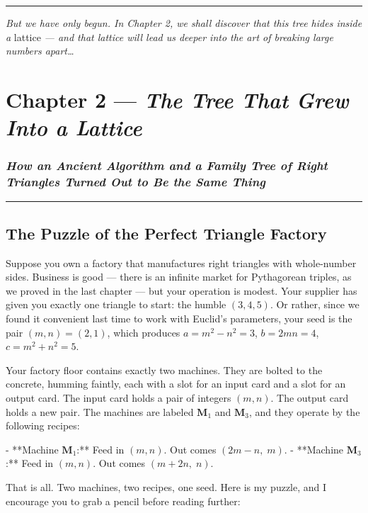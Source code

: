 \documentclass[12pt, letterpaper, openany]{book}
\theoremstyle{definition}
\theoremstyle{remark}
\begin{document}
\bigskip\noindent\rule{\textwidth}{0.4pt}\bigskip


\textit{But we have only begun. In Chapter 2, we shall discover that this tree hides inside a} lattice \textit{--- and that lattice will lead us deeper into the art of breaking large numbers apart{\ldots}}


\clearpage

\chapter{Chapter 2 --- \textit{The Tree That Grew Into a Lattice}}



\subsection*{\textit{How an Ancient Algorithm and a Family Tree of Right Triangles Turned Out to Be the Same Thing}}



\bigskip\noindent\rule{\textwidth}{0.4pt}\bigskip



\section*{The Puzzle of the Perfect Triangle Factory}


Suppose you own a factory that manufactures right triangles with whole-number sides. Business is good --- there is an infinite market for Pythagorean triples, as we proved in the last chapter --- but your operation is modest. Your supplier has given you exactly one triangle to start: the humble $(3, 4, 5)$. Or rather, since we found it convenient last time to work with Euclid's parameters, your seed is the pair $(m, n) = (2, 1)$, which produces $a = m^2 - n^2 = 3$, $b = 2mn = 4$, $c = m^2 + n^2 = 5$.

Your factory floor contains exactly two machines. They are bolted to the concrete, humming faintly, each with a slot for an input card and a slot for an output card. The input card holds a pair of integers $(m, n)$. The output card holds a new pair. The machines are labeled $\mathbf{M}_1$ and $\mathbf{M}_3$, and they operate by the following recipes:

- **Machine $\mathbf{M}_1$:** Feed in $(m, n)$. Out comes $(2m - n,\; m)$.
- **Machine $\mathbf{M}_3$:** Feed in $(m, n)$. Out comes $(m + 2n,\; n)$.

That is all. Two machines, two recipes, one seed. Here is my puzzle, and I encourage you to grab a pencil before reading further:
\end{document}
